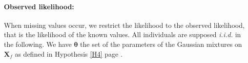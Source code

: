 \documentclass[12pt,a4paper]{report}
\begin{document}
\paragraph{Observed likelihood:} 
%
	 When missing values occur, we restrict the likelihood to the observed likelihood, that is the likelihood of the known values. All individuals are supposed {\it i.i.d.} in the following. %
	 We have $\boldsymbol{\theta}$ the set of the parameters of the Gaussian  mixtures on $\boldsymbol{X}_f$ as defined in Hypothesis \ref{H4} page \pageref{H4}.
				 		
\end{document}
